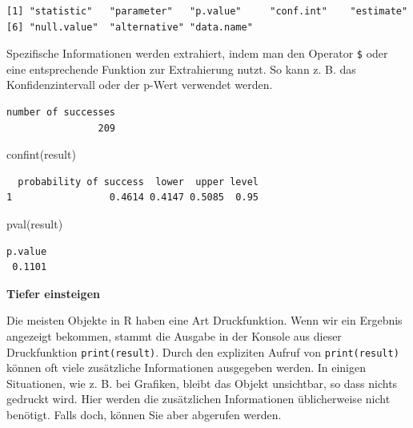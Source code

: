 \documentclass[
  ngerman,
]{scrbook}
\newenvironment{Shaded}{\begin{snugshade}}{\end{snugshade}}
\newcommand{\FunctionTok}[1]{\textcolor[rgb]{0.00,0.00,0.00}{#1}}
\newcommand{\NormalTok}[1]{#1}
\newcommand{\SpecialCharTok}[1]{\textcolor[rgb]{0.00,0.00,0.00}{#1}}
\newenvironment{tiefereinsteigen}[1]
  {
  \begin{itemize}
  \renewcommand{\labelitemi}{
    \raisebox{2.6\height}[0pt][0pt]{
      {\setkeys{Gin}{width=7em,keepaspectratio}
        {\normalsize \textcolor{dark-fom-green}\faSearch}}
        }
  }
  \begin{blackbox}
         \bgroup\color{dark-fom-green}
          {\textbf{Tiefer einsteigen}}
        \egroup
  \item
  }
  {
  \end{blackbox}
  \end{itemize}
  }
\begin{document}
\begin{verbatim}
[1] "statistic"   "parameter"   "p.value"     "conf.int"    "estimate"   
[6] "null.value"  "alternative" "data.name"  
\end{verbatim}

Spezifische Informationen werden extrahiert, indem man den Operator \texttt{\$} oder eine entsprechende Funktion zur Extrahierung nutzt. So kann z. B. das Konfidenzintervall oder der p-Wert verwendet werden.

\begin{Shaded}
\end{Shaded}

\begin{verbatim}
number of successes 
                209 
\end{verbatim}

\begin{Shaded}
\begin{Highlighting}[]
\FunctionTok{confint}\NormalTok{(result)}
\end{Highlighting}
\end{Shaded}

\begin{verbatim}
  probability of success  lower  upper level
1                 0.4614 0.4147 0.5085  0.95
\end{verbatim}

\begin{Shaded}
\begin{Highlighting}[]
\FunctionTok{pval}\NormalTok{(result)}
\end{Highlighting}
\end{Shaded}

\begin{verbatim}
p.value 
 0.1101 
\end{verbatim}

\begin{tiefereinsteigen}{tiefereinsteigen}
Die meisten Objekte in R haben eine Art Druckfunktion. Wenn wir ein Ergebnis angezeigt bekommen, stammt die Ausgabe in der Konsole aus dieser Druckfunktion \texttt{print(result)}. Durch den expliziten Aufruf von \texttt{print(result)} können oft viele zusätzliche Informationen ausgegeben werden. In einigen Situationen, wie z. B. bei Grafiken, bleibt das Objekt unsichtbar, so dass nichts gedruckt wird. Hier werden die zusätzlichen Informationen üblicherweise nicht benötigt. Falls doch, können Sie aber abgerufen werden.

\end{tiefereinsteigen}
\end{document}
